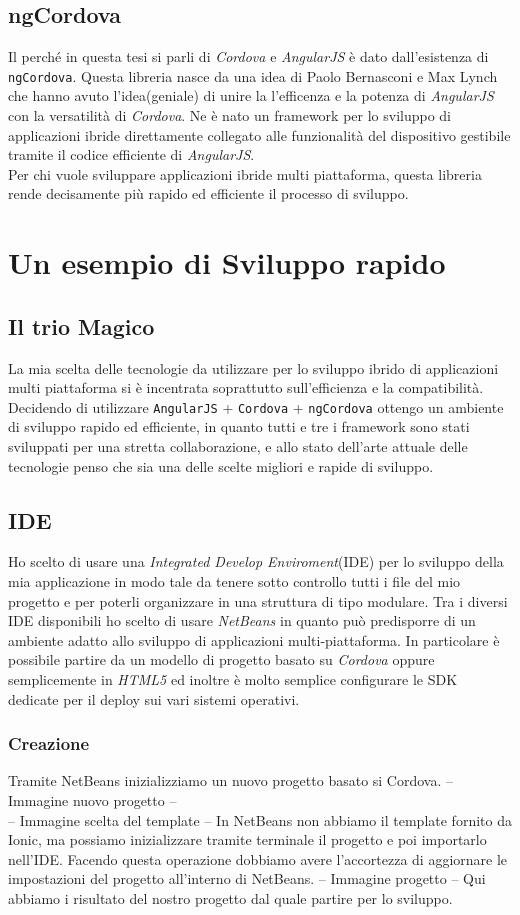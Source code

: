 \subsection{ngCordova}
Il perché in questa tesi si parli di \emph{Cordova} e \emph{AngularJS} è dato dall'esistenza di \texttt{ngCordova}. Questa libreria nasce da una idea di Paolo Bernasconi e Max Lynch che hanno avuto l'idea(geniale) di unire la l'efficenza e la potenza di \emph{AngularJS} con la versatilità di \emph{Cordova}. Ne è nato un framework per lo sviluppo di applicazioni ibride direttamente collegato alle funzionalità del dispositivo gestibile tramite il codice efficiente di \emph{AngularJS}.\\
Per chi vuole sviluppare applicazioni ibride multi piattaforma, questa libreria rende decisamente più rapido ed efficiente il processo di sviluppo.
\section{Un esempio di Sviluppo rapido}
\subsection{Il trio Magico}
La mia scelta delle tecnologie da utilizzare per lo sviluppo ibrido di applicazioni multi piattaforma si è incentrata soprattutto sull'efficienza e la compatibilità. Decidendo di utilizzare \texttt{AngularJS} + \texttt{Cordova} + \texttt{ngCordova} ottengo un ambiente di sviluppo rapido ed efficiente, in quanto tutti e tre i framework sono stati sviluppati per una stretta collaborazione, e allo stato dell'arte attuale delle tecnologie penso che sia una delle scelte migliori e rapide di sviluppo.
\subsection{IDE}
Ho scelto di usare una \emph{Integrated Develop Enviroment}(IDE) per lo sviluppo della mia applicazione in modo tale da tenere sotto controllo tutti i file del mio progetto e per poterli organizzare in una struttura di tipo modulare. 
Tra i diversi IDE disponibili ho scelto di usare \emph{NetBeans} in quanto può predisporre di un ambiente adatto allo sviluppo di applicazioni multi-piattaforma. In particolare è possibile partire da un modello di progetto basato su \emph{Cordova} oppure semplicemente in \emph{HTML5} ed inoltre è molto semplice configurare le SDK dedicate per il deploy sui vari sistemi operativi.
\subsubsection{Creazione}
Tramite NetBeans inizializziamo un nuovo progetto basato si Cordova.
-- Immagine nuovo progetto --\\
-- Immagine scelta del template --
In NetBeans non abbiamo il template fornito da Ionic, ma possiamo inizializzare tramite terminale il progetto e poi importarlo nell'IDE. Facendo questa operazione dobbiamo avere l'accortezza di aggiornare le impostazioni del progetto all'interno di NetBeans.
-- Immagine progetto --
Qui abbiamo i risultato del nostro progetto dal quale partire per lo sviluppo.
